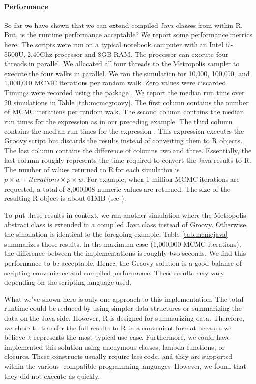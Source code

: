 \paragraph{Performance} So far we have shown that we can extend compiled Java classes from within R. But, is the runtime performance acceptable? We report some performance metrics here. The scripts were run on a typical notebook computer with an Intel i7-5500U, 2.40Ghz processor and 8GB RAM. The processor can execute four threads in parallel. We allocated all four threads to the Metropolis sampler to execute the four walks in parallel. We ran the simulation for 10,000, 100,000, and 1,000,000 MCMC iterations per random walk. Zero values were discarded. Timings were recorded using the  package \citep{microbenchmark}. We report the median run time over 20 simulations in Table \ref{tab:mcmcgroovy}. The first column contains the number of MCMC iterations per random walk. The second column contains the median run times for the expression  as in our preceding example. The third column contains the median run times for the expression . This expression executes the Groovy script but discards the results instead of converting them to R objects. The last column contains the difference of columns two and three. Essentially, the last column roughly represents the time required to convert the Java results to R. The number of values returned to R for each simulation is $p \times w + iterations \times p \times w$. For example, when 1 million MCMC iterations are requested, a total of 8,000,008 numeric values are returned. The size of the resulting R object is about 61MB (see ).

To put these results in context, we ran another simulation where the Metropolis abstract class is extended in a compiled Java class instead of Groovy. Otherwise, the simulation is identical to the foregoing example. Table \ref{tab:mcmcjava} summarizes those results. In the maximum case (1,000,000 MCMC iterations), the difference between the implementations is roughly two seconds. We find this performance to be acceptable. Hence, the Groovy solution is a good balance of scripting convenience and compiled performance. These results may vary depending on the scripting language used.

What we've shown here is only one approach to this implementation. The total runtime could be reduced by using simpler data structures or summarizing the data on the Java side. However, R is designed for summarizing data. Therefore, we chose to transfer the full results to R in a convenient format because we believe it represents the most typical use case. Furthermore, we could have implemented this solution using anonymous classes, lambda functions, or closures. These constructs usually require less code, and they are supported within the various -compatible programming languages. However, we found that they did not execute as quickly.


